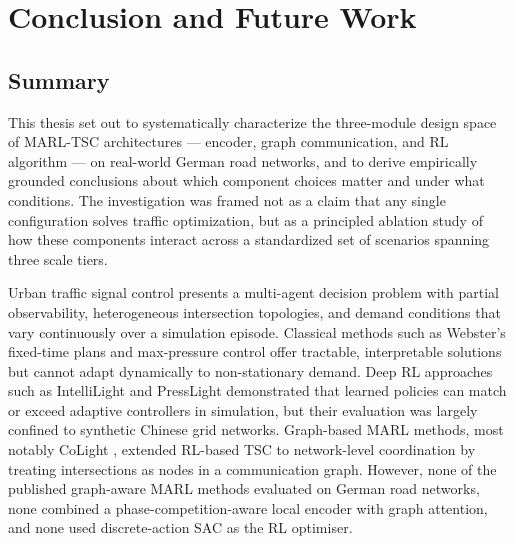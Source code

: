 \chapter{Conclusion and Future Work}
\label{ch:ConclusionFutureWork}

\section{Summary}
\label{sec:ConclusionFutureWork_Summary}

This thesis set out to systematically characterize the three-module design space of MARL-TSC architectures — encoder, graph communication, and RL algorithm — on real-world German road networks, and to derive empirically grounded conclusions about which component choices matter and under what conditions. The investigation was framed not as a claim that any single configuration solves traffic optimization, but as a principled ablation study of how these components interact across a standardized set of scenarios spanning three scale tiers.

Urban traffic signal control presents a multi-agent decision problem with partial observability, heterogeneous intersection topologies, and demand conditions that vary continuously over a simulation episode. Classical methods such as Webster's fixed-time plans and max-pressure control \citep{varaiya2013max} offer tractable, interpretable solutions but cannot adapt dynamically to non-stationary demand. Deep RL approaches such as IntelliLight \citep{wei2018intellilight} and PressLight \citep{wei2019presslight} demonstrated that learned policies can match or exceed adaptive controllers in simulation, but their evaluation was largely confined to synthetic Chinese grid networks. Graph-based MARL methods, most notably CoLight \citep{wei2019colight}, extended RL-based TSC to network-level coordination by treating intersections as nodes in a communication graph. However, none of the published graph-aware MARL methods evaluated on German road networks, none combined a phase-competition-aware local encoder with graph attention, and none used discrete-action SAC as the RL optimiser.

